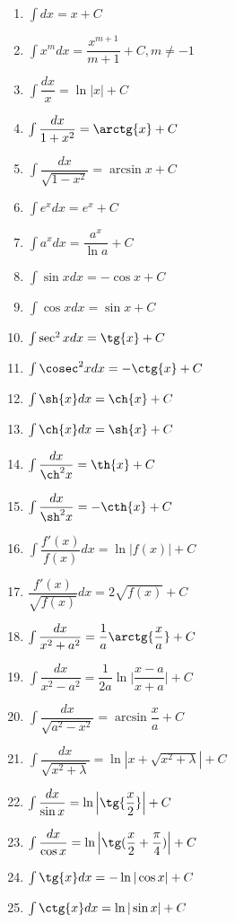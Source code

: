 \documentclass[a4paper,12pt,oneside]{extbook}
\theoremstyle{numbered}
\theoremstyle{unnumbered}
\theoremstyle{named}
\theoremstyle{unnumbered}
\theoremstyle{named}
\theoremstyle{named}
\theoremstyle{named}
\begin{document}
\begin{multicols}{2}
    \begin{enumerate}
        \item {\(\int dx = x + C\)}
        \item {\(\int x^m dx = \dfrac{x^{m + 1}}{m + 1} + C, m \neq -1\)}
        \item {\(\int \dfrac{dx}{x} = \ln|x| + C\)}
        \item {\(\int \dfrac{dx}{1 + x^2} = \arctg{x} + C\)}
        \item {\(\int \dfrac{dx}{\sqrt{1 - x^2}} = \arcsin{x} + C\)}
        \item {\(\int e^x dx = e^x + C\)}
        \item {\(\int a^x dx = \dfrac{a^x}{\ln{a}} + C\)}
        \item {\(\int \sin{x}dx = -\cos{x} + C\)}
        \item {\(\int \cos{x}dx = \sin{x} + C\)}
        \item {\(\int \sec^2{x}dx = \tg{x} + C\)}
        \item {\(\int \cosec^2{x}dx = -\ctg{x} + C\)}
        \item {\(\int \sh{x}dx = \ch{x} + C\)}
        \item {\(\int \ch{x}dx = \sh{x} + C\)}
        \item {\(\int \dfrac{dx}{\ch^2{x}} = \th{x} + C\)}
        \item {\(\int \dfrac{dx}{\sh^2{x}} = -\cth{x} + C\)}
        \item {\(\int \dfrac{f'(x)}{f(x)}dx = \ln|f(x)| + C\)}
        \item {\(\dfrac{f'(x)}{\sqrt{f(x)}}dx = 2\sqrt{f(x)} + C\)}
        \item {\(\int \dfrac{dx}{x^2 + a^2} = \dfrac{1}{a} \arctg{\dfrac{x}{a}} + C\)}
        \item {\(\int \dfrac{dx}{x^2 - a^2} = \dfrac{1}{2a} \ln {\Big|\dfrac{x - a}{x + a}\Big|} + C\)}
        \item {\(\int \dfrac{dx}{\sqrt{a^2 - x^2}} = \arcsin{\dfrac{x}{a}} + C\)}
        \item {\(\int \dfrac{dx}{\sqrt{x^2 + \lambda}} = \ln{|x + \sqrt{x^2 + \lambda}|} + C\)}
        \item {\(\int \dfrac{dx}{\sin{x}} = \ln \Big|\tg{\dfrac{x}{2}}\Big| + C\)}
        \item {\(\int \dfrac{dx}{\cos{x}} = \ln{\Big|\tg(\dfrac{x}{2} + \dfrac{\pi}{4})\Big|} + C\)}
        \item {\(\int \tg{x}dx = -\ln|\cos{x}| + C\)}
        \item {\(\int \ctg{x}dx = \ln|\sin{x}| + C\)}
    \end{enumerate}
\end{multicols}
\end{document}

